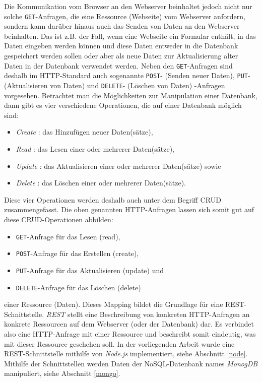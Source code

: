 Die Kommunikation vom Browser an den Webserver beinhaltet jedoch nicht nur solche \texttt{GET}-Anfragen, die eine Ressource (Webseite) vom Webserver anfordern, sondern kann darüber hinaus auch das Senden von Daten an den Webserver beinhalten. Das ist z.B. der Fall, wenn eine Webseite ein Formular enthält, in das Daten eingeben werden können und diese Daten entweder in die Datenbank gespeichert werden sollen oder aber als neue Daten zur Aktualisierung alter Daten in der Datenbank verwendet werden. Neben den \texttt{GET}-Anfragen sind deshalb im HTTP-Standard auch sogenannte \texttt{POST}- (Senden neuer Daten), \texttt{PUT}- (Aktualisieren von Daten) und \texttt{DELETE}- (Löschen von Daten) -Anfragen vorgesehen. Betrachtet man die Möglichkeiten zur Manipulation einer Datenbank, dann gibt es vier verschiedene Operationen, die auf einer Datenbank möglich sind:

\begin{itemize}
    \item \textit{Create} : das Hinzufügen neuer Daten(sätze),
    \item \textit{Read} : das Lesen einer oder mehrerer Daten(sätze),
    \item \textit{Update} : das Aktualisieren einer oder mehrerer Daten(sätze) sowie
    \item \textit{Delete} : das Löschen einer oder mehrerer Daten(sätze).
\end{itemize}

Diese vier Operationen werden deshalb auch unter dem Begriff \ac{CRUD} zusammengefasst. Die oben genannten HTTP-Anfragen lassen sich somit gut auf diese CRUD-Operationen abbilden:


\begin{itemize}
    \item \texttt{GET}-Anfrage für das Lesen (read),
    \item \texttt{POST}-Anfrage für das Erstellen (create),
    \item \texttt{PUT}-Anfrage für das Aktualisieren (update) und
    \item \texttt{DELETE}-Anfrage für das Löschen (delete)
\end{itemize}

einer Ressource (Daten). Dieses \glqq Mapping\grqq{} bildet die Grundlage für eine \ac{REST}-Schnittstelle. \textit{REST} stellt eine Beschreibung von konkreten HTTP-Anfragen an konkrete Ressourcen auf dem Webserver (oder der Datenbank) dar. Es verbindet also eine HTTP-Anfrage mit einer Ressource und beschreibt somit eindeutig, was mit dieser Ressource geschehen soll. In der vorliegenden Arbeit wurde eine REST-Schnittstelle mithilfe von \textit{Node.js} implementiert, siehe Abschnitt \ref{node}. Mithilfe der Schnittstellen werden Daten der  \ac{NoSQL}-Datenbank names \textit{MonogDB} manipuliert, siehe Abschnitt \ref{mongo}. 




 
